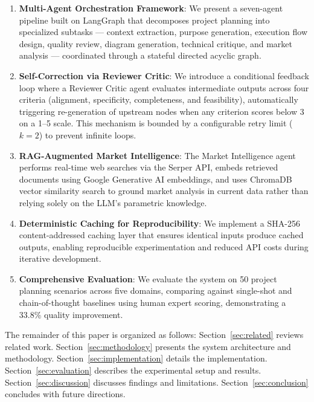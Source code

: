 \documentclass[journal]{IEEEtran}
\begin{document}
\begin{enumerate}[label=(\arabic*)]
    \item \textbf{Multi-Agent Orchestration Framework}: We present a seven-agent pipeline built on LangGraph \cite{langgraph2024} that decomposes project planning into specialized subtasks --- context extraction, purpose generation, execution flow design, quality review, diagram generation, technical critique, and market analysis --- coordinated through a stateful directed acyclic graph.
    
    \item \textbf{Self-Correction via Reviewer Critic}: We introduce a conditional feedback loop where a Reviewer Critic agent evaluates intermediate outputs across four criteria (alignment, specificity, completeness, and feasibility), automatically triggering re-generation of upstream nodes when any criterion scores below 3 on a 1--5 scale. This mechanism is bounded by a configurable retry limit ($k=2$) to prevent infinite loops.
    
    \item \textbf{RAG-Augmented Market Intelligence}: The Market Intelligence agent performs real-time web searches via the Serper API, embeds retrieved documents using Google Generative AI embeddings, and uses ChromaDB vector similarity search to ground market analysis in current data rather than relying solely on the LLM's parametric knowledge.
    
    \item \textbf{Deterministic Caching for Reproducibility}: We implement a SHA-256 content-addressed caching layer that ensures identical inputs produce cached outputs, enabling reproducible experimentation and reduced API costs during iterative development.
    
    \item \textbf{Comprehensive Evaluation}: We evaluate the system on 50 project planning scenarios across five domains, comparing against single-shot and chain-of-thought baselines using human expert scoring, demonstrating a 33.8\% quality improvement.
\end{enumerate}

The remainder of this paper is organized as follows: Section~\ref{sec:related} reviews related work. Section~\ref{sec:methodology} presents the system architecture and methodology. Section~\ref{sec:implementation} details the implementation. Section~\ref{sec:evaluation} describes the experimental setup and results. Section~\ref{sec:discussion} discusses findings and limitations. Section~\ref{sec:conclusion} concludes with future directions.
\end{document}
